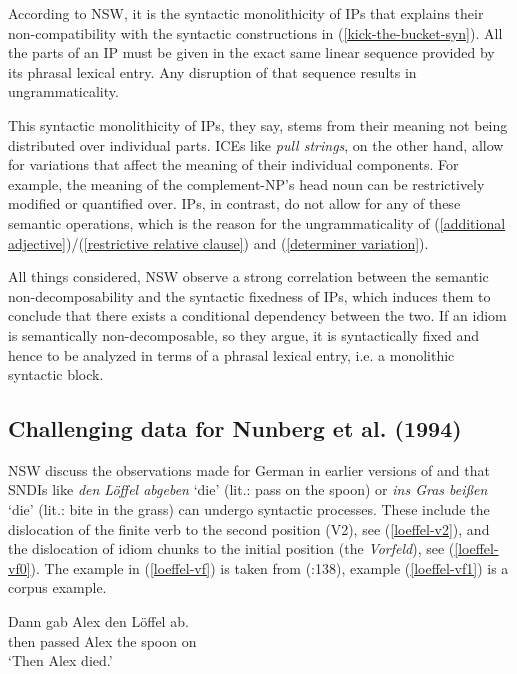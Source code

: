 \documentclass[output=paper]{langsci/langscibook}
\begin{document}
According to NSW, it is the syntactic monolithicity of IPs that explains their non-compatibility with the syntactic constructions in (\ref{kick-the-bucket-syn}). All the parts of an IP must be given in the exact same linear sequence provided by its phrasal lexical entry. Any disruption of that sequence results in ungrammaticality.

This syntactic monolithicity of IPs, they say, stems from their meaning not being distributed over individual parts. ICEs like \textit{pull strings}, on the other hand, allow for variations that affect the meaning of their individual components. For example, the meaning of the complement-NP's head noun can be restrictively modified or quantified over. 
IPs, in contrast, do not allow for any of these semantic operations, which is the reason for the ungrammaticality of  (\ref{additional adjective})/(\ref{restrictive relative clause}) and (\ref{determiner variation}).

All things considered, NSW observe a strong correlation between the  semantic non-decomposability and the syntactic fixedness of IPs, which induces them to conclude that there exists a conditional dependency between the two. If an idiom is semantically non-decomposable, so they argue, it is syntactically fixed and hence to be analyzed in terms of a phrasal lexical entry, i.e. a monolithic syntactic block.



\subsection{Challenging data for Nunberg et al. (1994)}

NSW discuss the observations made for  German in earlier versions of \cite{Schenk:95} and \cite{Webelhuth:Ackermann:99} that SNDIs like \textit{den L\"offel abgeben} `die' (lit.: pass on the spoon) or \textit{ins Gras bei{\ss}en} `die' (lit.: bite in the grass) can undergo syntactic processes.
These include the dislocation of the finite verb to the second position (V2), see (\ref{loeffel-v2}), and the dislocation of idiom chunks to the initial position (the \textit{Vorfeld}), see (\ref{loeffel-vf0}). The example in (\ref{loeffel-vf}) is taken from \citeauthor{Trotzke:Zwart:14} (\citeyear{Trotzke:Zwart:14}:138), example (\ref{loeffel-vf1}) is a corpus example.

\begin{exe}
\ex\label{loeffel-v2} \label{Loffel} \label{loeffel}
\gll Dann gab Alex den L\"offel ab.\\
     then passed Alex the spoon on\\
\glt `Then Alex died.'
\end{exe}
\end{document}
